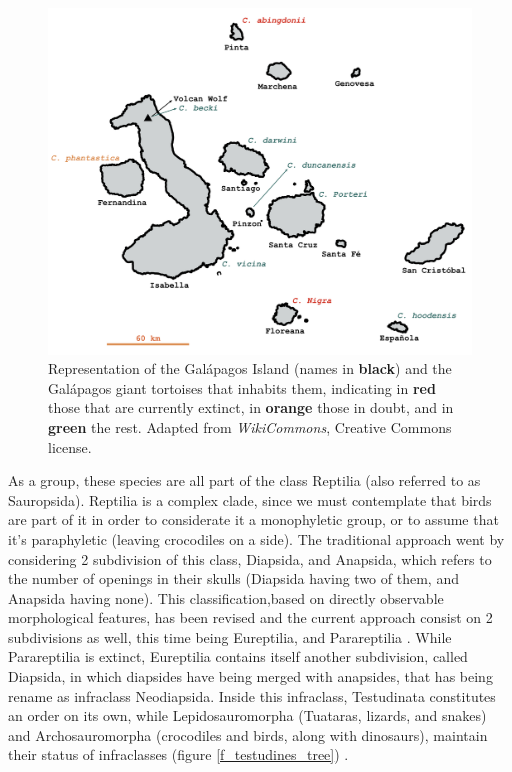 \begin{figure}[t!]
    \begin{center}
        \includegraphics[width=1\textwidth]{figures/galapagos.pdf}
        \caption[Gal\'{a}pagos giant tortoises and their habitat]{\footnotesize Representation of the Gal\'{a}pagos Island (names in \textbf{black}) and the Gal\'{a}pagos giant tortoises that inhabits them, indicating in \textcolor{myred1}{\textbf{red}} those that are currently extinct, in \textcolor{myora1}{\textbf{orange}} those in doubt, and in \textcolor{mygre2}{\textbf{green}} the rest. Adapted from \textsl{WikiCommons}, Creative Commons license.}
        \label{f_galapagos}
    \end{center}
\end{figure}

As a group, these species are all part of the class Reptilia (also referred to as Sauropsida).
Reptilia is a complex clade, since we must contemplate that birds are part of it in order to considerate it a monophyletic group, or to assume that it's paraphyletic (leaving crocodiles on a side).
The traditional approach went by considering 2 subdivision of this class, Diapsida, and Anapsida, which refers to the number of openings in their skulls (Diapsida having two of them, and Anapsida having none).
This classification,based on directly observable morphological features, has been revised and the current approach consist on 2 subdivisions as well, this time being Eureptilia, and Parareptilia \cite{Benton2014}.
While Parareptilia is extinct, Eureptilia contains itself another subdivision, called Diapsida, in which diapsides have being merged with anapsides, that has being rename as infraclass Neodiapsida.
Inside this infraclass, Testudinata constitutes an order on its own, while Lepidosauromorpha (Tuataras, lizards, and snakes) and Archosauromorpha (crocodiles and birds, along with dinosaurs), maintain their status of infraclasses (figure \ref{f_testudines_tree}) \cite{Mannen1999,Modesto2004}.

